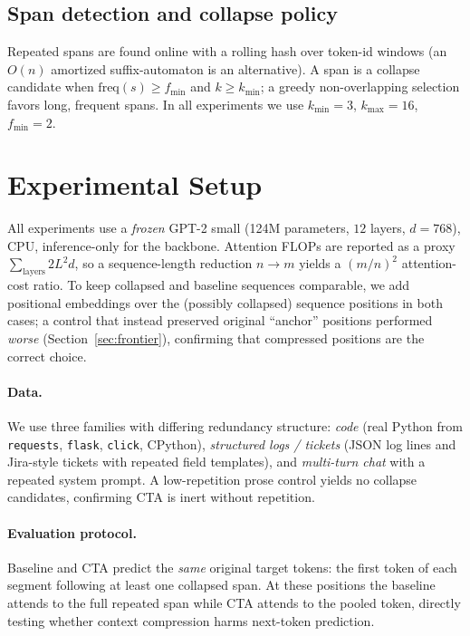 \documentclass[11pt]{article}
\begin{document}
\subsection{Span detection and collapse policy}
Repeated spans are found online with a rolling hash over token-id windows (an $O(n)$
amortized suffix-automaton is an alternative). A span is a collapse candidate when
$\mathrm{freq}(s)\ge f_{\min}$ and $k\ge k_{\min}$; a greedy non-overlapping selection
favors long, frequent spans. In all experiments we use $k_{\min}=3$, $k_{\max}=16$,
$f_{\min}=2$.

\section{Experimental Setup}
\label{sec:setup}

All experiments use a \emph{frozen} GPT-2 small (124M parameters, $12$ layers, $d=768$),
CPU, inference-only for the backbone. Attention FLOPs are reported as a proxy
$\sum_{\text{layers}} 2 L^2 d$, so a sequence-length reduction $n\to m$ yields a
$(m/n)^2$ attention-cost ratio. To keep collapsed and baseline sequences comparable, we
add positional embeddings over the (possibly collapsed) sequence positions in both cases;
a control that instead preserved original ``anchor'' positions performed \emph{worse}
(Section~\ref{sec:frontier}), confirming that compressed positions are the correct choice.

\paragraph{Data.} We use three families with differing redundancy structure:
\emph{code} (real Python from \texttt{requests}, \texttt{flask}, \texttt{click},
CPython), \emph{structured logs / tickets} (JSON log lines and Jira-style tickets with
repeated field templates), and \emph{multi-turn chat} with a repeated system prompt. A
low-repetition prose control yields no collapse candidates, confirming CTA is inert
without repetition.

\paragraph{Evaluation protocol.} Baseline and CTA predict the \emph{same} original target
tokens: the first token of each segment following at least one collapsed span. At these
positions the baseline attends to the full repeated span while CTA attends to the pooled
token, directly testing whether context compression harms next-token prediction.
\end{document}

